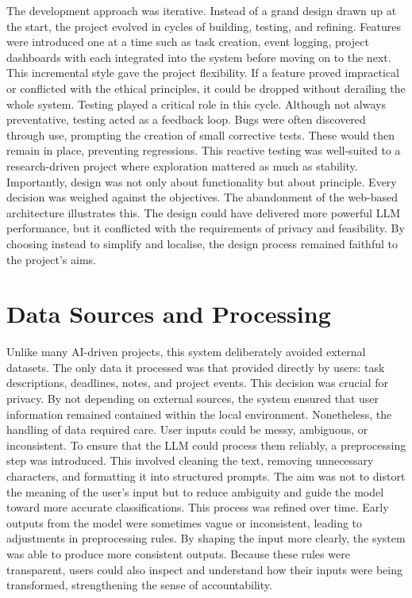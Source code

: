 \documentclass{report}
\begin{document}
The development approach was iterative. Instead of a grand design drawn up at the start, the project evolved in cycles of building, testing, and refining. Features were introduced one at a time such as task creation, event logging, project dashboards with each integrated into the system before moving on to the next. This incremental style gave the project flexibility. If a feature proved impractical or conflicted with the ethical principles, it could be dropped without derailing the whole system.
Testing played a critical role in this cycle. Although not always preventative, testing acted as a feedback loop. Bugs were often discovered through use, prompting the creation of small corrective tests. These would then remain in place, preventing regressions. This reactive testing was well-suited to a research-driven project where exploration mattered as much as stability.
Importantly, design was not only about functionality but about principle. Every decision was weighed against the objectives. The abandonment of the web-based architecture illustrates this. The design could have delivered more powerful LLM performance, but it conflicted with the requirements of privacy and feasibility. By choosing instead to simplify and localise, the design process remained faithful to the project’s aims.

\section{Data Sources and Processing}

Unlike many AI-driven projects, this system deliberately avoided external datasets. The only data it processed was that provided directly by users: task descriptions, deadlines, notes, and project events. This decision was crucial for privacy. By not depending on external sources, the system ensured that user information remained contained within the local environment.
Nonetheless, the handling of data required care. User inputs could be messy, ambiguous, or inconsistent. To ensure that the LLM could process them reliably, a preprocessing step was introduced. This involved cleaning the text, removing unnecessary characters, and formatting it into structured prompts. The aim was not to distort the meaning of the user’s input but to reduce ambiguity and guide the model toward more accurate classifications.
This process was refined over time. Early outputs from the model were sometimes vague or inconsistent, leading to adjustments in preprocessing rules. By shaping the input more clearly, the system was able to produce more consistent outputs. Because these rules were transparent, users could also inspect and understand how their inputs were being transformed, strengthening the sense of accountability.
\end{document}

